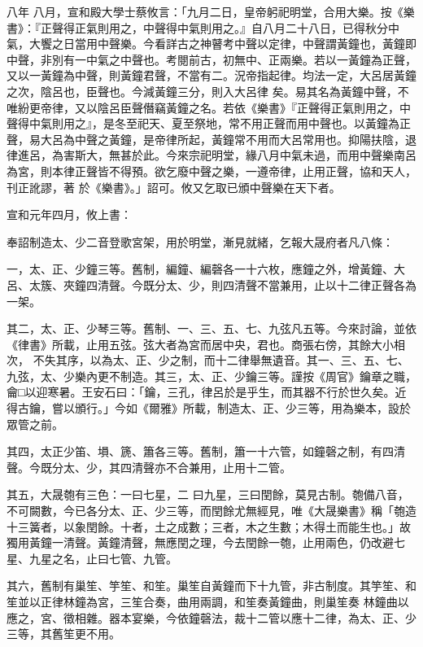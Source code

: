 \begin{pinyinscope}
 八年
 八月，宣和殿大學士蔡攸言：「九月二日，皇帝躬祀明堂，合用大樂。按《樂書》：『正聲得正氣則用之，中聲得中氣則用之。』自八月二十八日，已得秋分中氣，大饗之日當用中聲樂。今看詳古之神瞽考中聲以定律，中聲謂黃鐘也，黃鐘即中聲，非別有一中氣之中聲也。考閱前古，初無中、正兩樂。若以一黃鐘為正聲，又以一黃鐘為中聲，則黃鐘君聲，不當有二。況帝指起律。均法一定，大呂居黃鐘之次，陰呂也，臣聲也。今減黃鐘三分，則入大呂律
 矣。易其名為黃鐘中聲，不唯紛更帝律，又以陰呂臣聲僭竊黃鐘之名。若依《樂書》『正聲得正氣則用之，中聲得中氣則用之』，是冬至祀天、夏至祭地，常不用正聲而用中聲也。以黃鐘為正聲，易大呂為中聲之黃鐘，是帝律所起，黃鐘常不用而大呂常用也。抑陽扶陰，退律進呂，為害斯大，無甚於此。今來宗祀明堂，緣八月中氣未過，而用中聲樂南呂為宮，則本律正聲皆不得預。欲乞廢中聲之樂，一遵帝律，止用正聲，協和天人，刊正訛謬，著
 於《樂書》。」詔可。攸又乞取已頒中聲樂在天下者。



 宣和元年四月，攸上書：



 奉詔制造太、少二音登歌宮架，用於明堂，漸見就緒，乞報大晟府者凡八條：



 一，太、正、少鐘三等。舊制，編鐘、編磬各一十六枚，應鐘之外，增黃鐘、大呂、太簇、夾鐘四清聲。今既分太、少，則四清聲不當兼用，止以十二律正聲各為一架。



 其二，太、正、少琴三等。舊制、一、三、五、七、九弦凡五等。今來討論，並依《律書》所載，止用五弦。弦大者為宮而居中央，君也。商張右傍，其餘大小相次，
 不失其序，以為太、正、少之制，而十二律舉無遺音。其一、三、五、七、九弦，太、少樂內更不制造。其三，太、正、少鑰三等。謹按《周官》鑰章之職，龠□以迎寒暑。王安石曰：「鑰，三孔，律呂於是乎生，而其器不行於世久矣。近得古鑰，嘗以頒行。」今如《爾雅》所載，制造太、正、少三等，用為樂本，設於眾管之前。



 其四，太正少笛、塤、篪、簫各三等。舊制，簫一十六管，如鐘磬之制，有四清聲。今既分太、少，其四清聲亦不合兼用，止用十二管。



 其五，大晟匏有三色：一曰七星，二
 曰九星，三曰閏餘，莫見古制。匏備八音，不可闕數，今已各分太、正、少三等，而閏餘尤無經見，唯《大晟樂書》稱「匏造十三簧者，以象閏餘。十者，土之成數；三者，木之生數；木得土而能生也。」故獨用黃鐘一清聲。黃鐘清聲，無應閏之理，今去閏餘一匏，止用兩色，仍改避七星、九星之名，止曰七管、九管。



 其六，舊制有巢笙、竽笙、和笙。巢笙自黃鐘而下十九管，非古制度。其竽笙、和笙並以正律林鐘為宮，三笙合奏，曲用兩調，和笙奏黃鐘曲，則巢笙奏
 林鐘曲以應之，宮、徵相雜。器本宴樂，今依鐘磬法，裁十二管以應十二律，為太、正、少三等，其舊笙更不用。




\end{pinyinscope}
